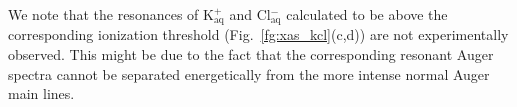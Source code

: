 {\color{blue} We note that the resonances of K$^{+}_{\text{aq}}$ and Cl$^{-}_{\text{aq}}$ calculated to be above the corresponding ionization threshold (Fig.\ \ref{fg:xas_kcl}(c,d)) are not experimentally observed. This might be due to the fact that the corresponding resonant Auger spectra cannot be separated energetically from the more intense normal Auger main lines.}







